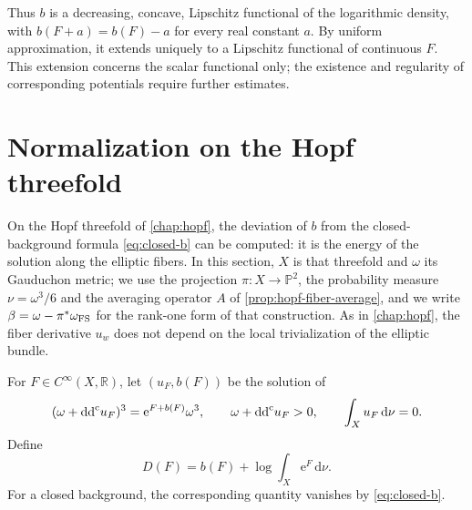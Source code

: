 Thus $b$ is a decreasing, concave, Lipschitz functional of the logarithmic density, with $b(F+a)=b(F)-a$ for every real constant $a$. By uniform approximation, it extends uniquely to a Lipschitz functional of continuous $F$. This extension concerns the scalar functional only; the existence and regularity of corresponding potentials require further estimates.



\section{Normalization on the Hopf threefold}
\label{sec:hopf-normalization}

On the Hopf threefold of \cref{chap:hopf}, the deviation of $b$ from the closed-background formula \eqref{eq:closed-b} can be computed: it is the energy of the solution along the elliptic fibers. In this section, $X$ is that threefold and $\omega$ its Gauduchon metric; we use the projection $\pi\colon X\to\mathbb P^2$, the probability measure $\nu=\omega^3/6$ and the averaging operator $A$ of \cref{prop:hopf-fiber-average}, and we write $\beta=\omega-\pi^*\omega_{\mathrm{FS}}$ for the rank-one form of that construction. As in \cref{chap:hopf}, the fiber derivative $u_w$ does not depend on the local trivialization of the elliptic bundle.

For $F\in C^\infty(X,\mathbb R)$, let $(u_F,b(F))$ be the solution of
\[
 (\omega+\mathrm{dd}^{\mathrm{c}} u_F)^3=\mathrm{e}^{F+b(F)}\omega^3,
 \qquad \omega+\mathrm{dd}^{\mathrm{c}} u_F>0,\qquad \int_Xu_F\,\mathrm{d}\nu=0.
\]
Define
\[
 D(F)=b(F)+\log\int_X\mathrm{e}^F\,\mathrm{d}\nu.
\]
For a closed background, the corresponding quantity vanishes by \eqref{eq:closed-b}.

